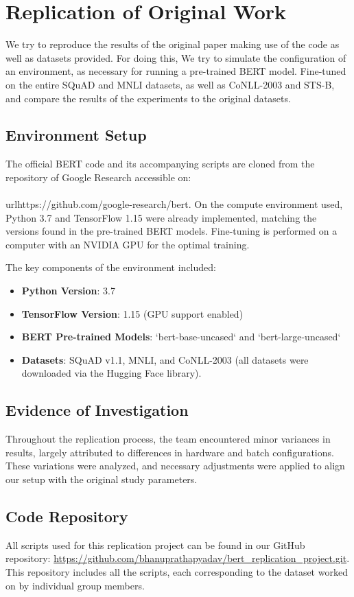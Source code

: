 ﻿\documentclass{article}
\begin{document}
\section{Replication of Original Work}
We try to reproduce the results of the original paper making use of the code as well as datasets provided. For doing this,
We try to simulate the configuration of an environment, as necessary for running a pre-trained BERT model.
Fine-tuned on the entire SQuAD and MNLI datasets, as well as CoNLL-2003 and STS-B, and compare the results of the experiments to the original datasets.

\subsection{Environment Setup}
The official BERT code and its accompanying scripts are cloned from the repository of Google Research accessible on: \\\\url{https://github.com/google-research/bert}. On the compute environment used, Python 3.7 and TensorFlow 1.15 were already implemented, matching the versions found in the pre-trained BERT models. Fine-tuning is performed on a computer with an NVIDIA GPU for the optimal training.

The key components of the environment included:
\begin{itemize}
    \item \textbf{Python Version}: 3.7
    \item \textbf{TensorFlow Version}: 1.15 (GPU support enabled)
    \item \textbf{BERT Pre-trained Models}: `bert-base-uncased` and `bert-large-uncased`
    \item \textbf{Datasets}: SQuAD v1.1, MNLI, and CoNLL-2003 (all datasets were downloaded via the Hugging Face library).
\end{itemize}

\subsection*{Evidence of Investigation}
{
Throughout the replication process, the team encountered minor variances in results, largely attributed to differences in hardware and batch configurations. These variations were analyzed, and necessary adjustments were applied to align our setup with the original study parameters.
}

\subsection*{Code Repository}
{
All scripts used for this replication project can be found in our GitHub repository: \href{https://github.com/bhanuprathapyadav/bert_replication_project.git}{https://github.com/bhanuprathapyadav/bert\_replication\_project.git}. This repository includes all the scripts, each corresponding to the dataset worked on by individual group members.
}
\end{document}

